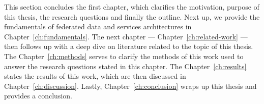 This section concludes the first chapter, which clarifies the motivation, purpose of this thesis, the research questions and finally the outline.
Next up, we provide the fundamentals of federated data and services architectures in Chapter~\ref{ch:fundamentals}.
The next chapter --- Chapter~\ref{ch:related-work} --- then follows up with a deep dive on literature related to the topic of this thesis.
The Chapter~\ref{ch:methods} serves to clarify the methods of this work used to answer the research questions stated in this chapter.
The Chapter~\ref{ch:results} states the results of this work, which are then discussed in Chapter~\ref{ch:discussion}.
Lastly, Chapter~\ref{ch:conclusion} wraps up this thesis and provides a conclusion.
